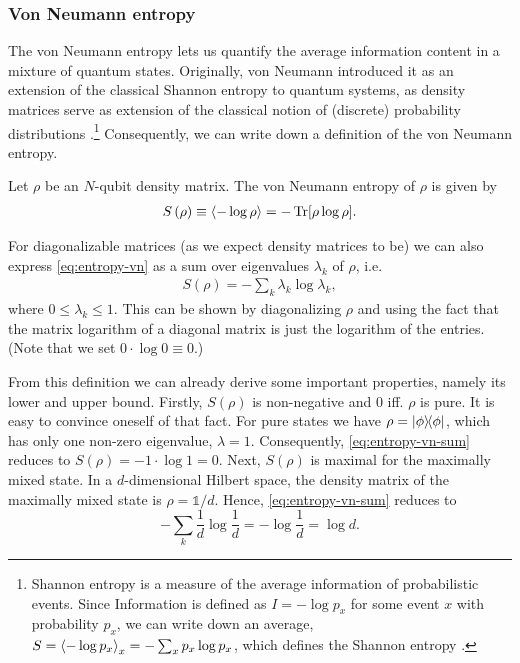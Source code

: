 \subsubsection{Von Neumann entropy}
The von Neumann entropy lets us quantify the average information content in a mixture of
quantum states. Originally, von Neumann introduced it as an extension of the
classical Shannon entropy to quantum systems, as density matrices serve as
extension of the classical notion of (discrete) probability distributions
\cite{vonneumannMathematischeGrundlagenQuantenmechanik1968}.\footnote{Shannon
  entropy is a measure of the average information of probabilistic events.
  Since Information is defined as $I=-\log p_x$ for some event $x$ with
  probability $p_x$, we can write down an average, $S = \expval{-\log p_x}_x =
  -\sum_x p_x \log p_x$, which defines the Shannon entropy
\cite{shannonMathematicalTheoryCommunication1948}.} 
Consequently, we can write down a definition of the von Neumann entropy.
\begin{defn}\label{defn:vonneumann}
  Let $\rho$ be an $N$-qubit density matrix. The von Neumann entropy of $\rho$
  is given by
  \begin{align}\label{eq:entropy-vn}
    S\left(\rho\right) \equiv \expval{-\log \rho} = -\Tr[\rho\log\rho]
  .\end{align}
\end{defn}
For diagonalizable matrices (as we expect density matrices to be) we can also
express \cref{eq:entropy-vn} as a sum over eigenvalues $\lambda_k$ of $\rho$, i.e.
\begin{align}\label{eq:entropy-vn-sum}
  S\left(\rho\right) = -\sum_k \lambda_k \log \lambda_k
,\end{align}
where $0\leq\lambda_k\leq 1$.
This can be shown by diagonalizing $\rho$ and using the fact that the matrix
logarithm of a diagonal matrix is just the logarithm of the entries.
(Note that we set $0\cdot\log 0 \equiv 0$.)

From this definition we can already derive some important properties, namely
its lower and upper bound. Firstly, $S(\rho)$ is non-negative and $0$ iff.
$\rho$ is pure. It is easy to convince oneself of that fact. For pure states we
have $\rho = \dyad{\phi}$, which has only one non-zero eigenvalue, $\lambda =
1$. Consequently, \cref{eq:entropy-vn-sum} reduces to $S(\rho) = - 1\cdot\log 1
=0$.  Next, $S(\rho)$ is maximal for the maximally mixed state. In a
$d$-dimensional Hilbert space, the density matrix of the maximally mixed state
is $\rho = \mathds{1}/d$. Hence, \cref{eq:entropy-vn-sum} reduces to
\[
  -\sum_k \frac{1}{d} \log \frac{1}{d} = -\log \frac{1}{d} = \log d
.\]
